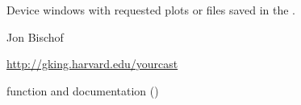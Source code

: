 %
\begin{Value}
Device windows with requested plots or  files saved
in the .  
\end{Value}
%
\begin{Author}\relax
Jon Bischof 
\end{Author}
%
\begin{References}\relax
\url{http://gking.harvard.edu/yourcast}
\end{References}
%
\begin{SeeAlso}\relax
{} function and documentation
()
\end{SeeAlso}
